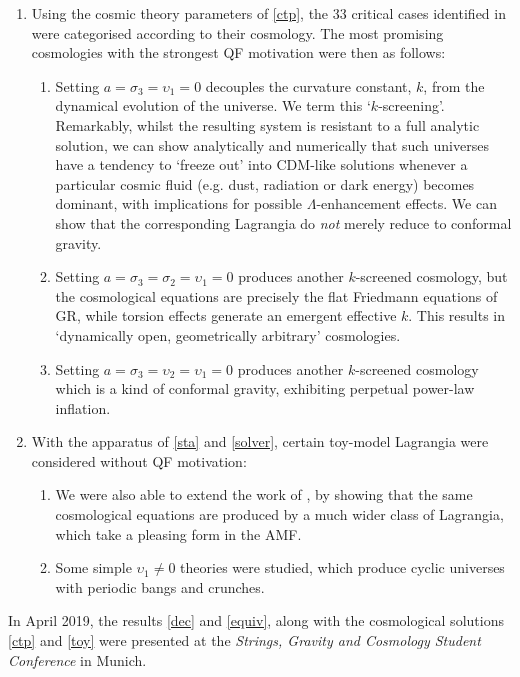 \documentclass[twoside]{report}
\begin{document}
\begin{multicols}{2}
  \begin{enumerate}[resume]
  \item Using the cosmic theory parameters of \ref{ctp}, the 33 critical cases identified in \cite{2019PhRvD..99f4001L,Lin2} were categorised according to their cosmology. The most promising cosmologies with the strongest QF motivation were then as follows:
    \begin{enumerate}
      \item\label{D} Setting $a=\sigma_3=\upsilon_1=0$ decouples the curvature constant, $k$, from the dynamical evolution of the universe. We term this `$k$-screening'. Remarkably, whilst the resulting system is resistant to a full analytic solution, we can show analytically and numerically that such universes have a tendency to `freeze out' into \textLambda CDM-like solutions whenever a particular cosmic fluid (e.g. dust, radiation or dark energy) becomes dominant, with implications for possible $\Lambda$-enhancement effects. We can show that the corresponding Lagrangia do \textit{not} merely reduce to conformal gravity.
      \item\label{ek} Setting $a=\sigma_3=\sigma_2=\upsilon_1=0$ produces another $k$-screened cosmology, but the cosmological equations are precisely the flat Friedmann equations of GR, while torsion effects generate an emergent effective $k$. This results in `dynamically open, geometrically arbitrary' cosmologies.
      \item\label{inf} Setting $a=\sigma_3=\upsilon_2=\upsilon_1=0$ produces another $k$-screened cosmology which is a kind of conformal gravity, exhibiting perpetual power-law inflation. 
    \end{enumerate}
  \item\label{toy} With the apparatus of \ref{sta} and \ref{solver}, certain toy-model Lagrangia were considered without QF motivation:
    \begin{enumerate}[resume]
      \item We were also able to extend the work of \cite{lasenby-doran-heineke-2005}, by showing that the same cosmological equations are produced by a much wider class of Lagrangia, which take a pleasing form in the AMF.
      \item Some simple $\upsilon_1\neq 0$ theories were studied, which produce cyclic universes with periodic bangs and crunches.
  \end{enumerate}
\end{enumerate}
In April 2019, the results \ref{dec} and \ref{equiv}, along with the cosmological solutions \ref{ctp} and \ref{toy} were presented \cite{poster} at the \textit{Strings, Gravity and Cosmology Student Conference} in Munich.


\end{multicols}
\end{document}
